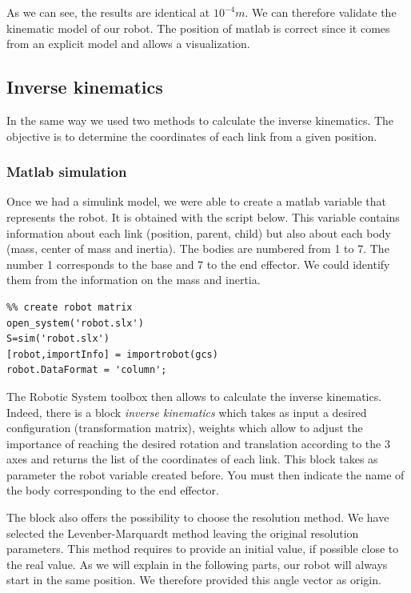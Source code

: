\bigbreak
As we can see, the results are identical at $10^{-4}m$. We can therefore validate the kinematic model of our robot. The position of matlab is correct since it comes from an explicit model and allows a visualization.

\subsection{Inverse kinematics}

In the same way we used two methods to calculate the inverse kinematics. The objective is to determine the coordinates of each link from a given position.

\subsubsection{Matlab simulation}

Once we had a simulink model, we were able to create a matlab variable that represents the robot. It is obtained with the script below.  This variable contains information about each link (position, parent, child) but also about each body (mass, center of mass and inertia). The bodies are numbered from 1 to 7. The number 1 corresponds to the base and 7 to the end effector. We could identify them from the information on the mass and inertia.

\begin{verbatim}
%% create robot matrix
open_system('robot.slx')
S=sim('robot.slx')
[robot,importInfo] = importrobot(gcs)
robot.DataFormat = 'column';
\end{verbatim}

\bigbreak
The Robotic System toolbox then allows to calculate the inverse kinematics. Indeed, there is a block \textit{inverse kinematics} which takes as input a desired configuration (transformation matrix), weights which allow to adjust the importance of reaching the desired rotation and translation according to the 3 axes and returns the list of the coordinates of each link. This block takes as parameter the robot variable created before. You must then indicate the name of the body corresponding to the end effector. 

\bigbreak
The block also offers the possibility to choose the resolution method. We have selected the Levenber-Marquardt method leaving the original resolution parameters. This method requires to provide an initial value, if possible close to the real value. As we will explain in the following parts, our robot will always start in the same position. We therefore provided this angle vector as origin.

